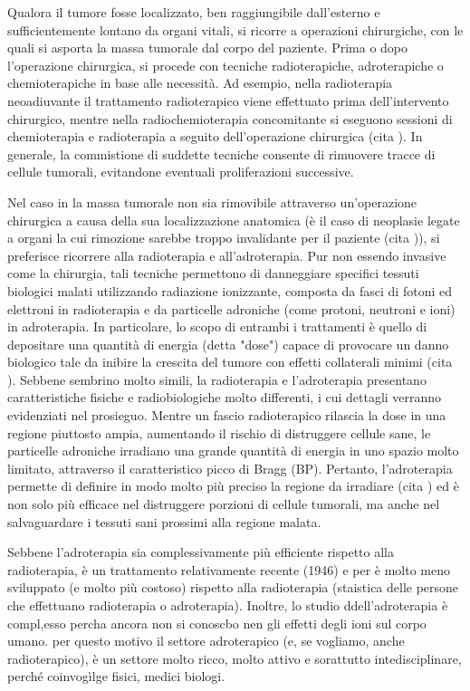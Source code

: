 \documentclass[12pt,a4paper,twoside]{report}
\begin{document}
	Qualora il tumore fosse localizzato, ben raggiungibile dall'esterno e sufficientemente lontano da organi vitali, si ricorre a operazioni chirurgiche, con le quali si asporta la massa tumorale dal corpo del paziente. Prima o dopo l'operazione chirurgica, si procede con tecniche radioterapiche, adroterapiche o chemioterapiche in base alle necessità. Ad esempio, nella radioterapia neoadiuvante il trattamento radioterapico viene effettuato prima dell'intervento chirurgico, mentre nella radiochemioterapia concomitante si eseguono sessioni di chemioterapia e radioterapia a seguito dell'operazione chirurgica (cita
	). In generale, la commistione di suddette tecniche consente di rimuovere tracce di cellule tumorali, evitandone eventuali proliferazioni successive.
	
	Nel caso in la massa tumorale non sia rimovibile attraverso un'operazione chirurgica a causa della sua localizzazione anatomica (è il caso di neoplasie legate a organi la cui rimozione sarebbe troppo invalidante per il paziente (cita
	)), si preferisce ricorrere alla radioterapia e all'adroterapia. Pur non essendo invasive come la chirurgia, tali tecniche permettono di danneggiare specifici tessuti biologici malati utilizzando radiazione ionizzante, composta da fasci di fotoni ed elettroni in radioterapia e da particelle adroniche (come protoni, neutroni e ioni) in adroterapia. In particolare, lo scopo di entrambi i trattamenti è quello di depositare una quantità di energia (detta "dose") capace di provocare un danno biologico tale da inibire la crescita del tumore con effetti collaterali minimi (cita
	). Sebbene sembrino molto simili, la radioterapia e l'adroterapia presentano caratteristiche fisiche e radiobiologiche molto differenti, i cui dettagli verranno evidenziati nel prosieguo. Mentre un fascio radioterapico rilascia la dose in una regione piuttosto ampia, aumentando il rischio di distruggere cellule sane, le particelle adroniche irradiano una grande quantità di energia in uno spazio molto limitato, attraverso il caratteristico picco di Bragg (BP). Pertanto, l'adroterapia permette di definire in modo molto più preciso la regione da irradiare (cita
	) ed è non solo più efficace nel distruggere porzioni di cellule tumorali, ma anche nel salvaguardare i tessuti sani prossimi alla regione malata.
	
	Sebbene l'adroterapia sia complessivamente più efficiente rispetto alla radioterapia, è un trattamento relativamente recente (1946) e per è molto meno sviluppato (e molto più costoso) rispetto alla radioterapia (staistica delle persone che effettuano radioterapia o adroterapia). Inoltre, lo studio ddell'adroterapia è compl,esso percha ancora non si conoscbo nen gli effetti degli ioni sul corpo umano. per questo motivo il settore adroterapico (e, se vogliamo, anche radioterapico), è un settore molto ricco, molto attivo e sorattutto intedisciplinare, perché coinvogìlge fisici, medici biologi.
	
\end{document}
